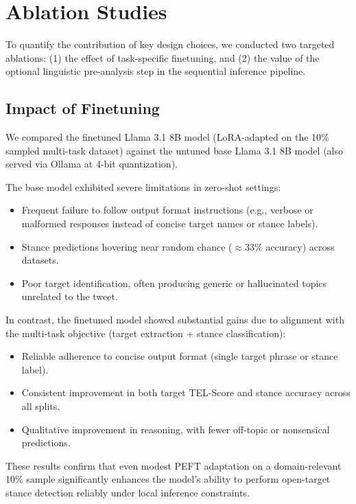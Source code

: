\documentclass[conference]{IEEEtran}
\begin{document}
\section{Ablation Studies}

To quantify the contribution of key design choices, we conducted two targeted ablations: (1) the effect of task-specific finetuning, and (2) the value of the optional linguistic pre-analysis step in the sequential inference pipeline.

\subsection{Impact of Finetuning}

We compared the finetuned Llama 3.1 8B model (LoRA-adapted on the 10\% sampled multi-task dataset) against the untuned base Llama 3.1 8B model (also served via Ollama at 4-bit quantization).

The base model exhibited severe limitations in zero-shot settings:
\begin{itemize}
    \item Frequent failure to follow output format instructions (e.g., verbose or malformed responses instead of concise target names or stance labels).
    \item Stance predictions hovering near random chance ($\approx 33\%$ accuracy) across datasets.
    \item Poor target identification, often producing generic or hallucinated topics unrelated to the tweet.
\end{itemize}

In contrast, the finetuned model showed substantial gains due to alignment with the multi-task objective (target extraction + stance classification):
\begin{itemize}
    \item Reliable adherence to concise output format (single target phrase or stance label).
    \item Consistent improvement in both target TEL-Score and stance accuracy across all splits.
    \item Qualitative improvement in reasoning, with fewer off-topic or nonsensical predictions.
\end{itemize}

These results confirm that even modest PEFT adaptation on a domain-relevant 10\% sample significantly enhances the model's ability to perform open-target stance detection reliably under local inference constraints.
\end{document}
